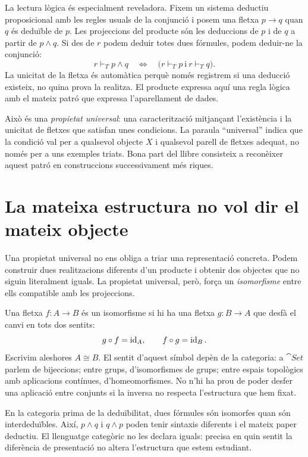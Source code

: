 La lectura lògica és especialment reveladora. Fixem un sistema deductiu
proposicional amb les regles usuals de la conjunció i posem una fletxa
$p\to q$ quan $q$ és deduïble de $p$. Les projeccions del producte són les
deduccions de $p$ i de $q$ a partir de $p\land q$. Si des de $r$ podem
deduir totes dues fórmules, podem deduir-ne la conjunció:
\[
  r\vdash_T p\land q
  \quad\Longleftrightarrow\quad
  \bigl(r\vdash_T p\ \text{i}\ r\vdash_T q\bigr).
\]
La unicitat de la fletxa és automàtica perquè només registrem si una
deducció existeix, no quina prova la realitza. El producte expressa aquí
una regla lògica amb el mateix patró que expressa l'aparellament de dades.

Això és una \emph{propietat universal}: una caracterització mitjançant
l'existència i la unicitat de fletxes que satisfan unes condicions.
La paraula \enquote{universal} indica que la condició val per a qualsevol objecte
$X$ i qualsevol parell de fletxes adequat, no només per a uns exemples
triats. Bona part del llibre consisteix a reconèixer aquest patró en
construccions successivament més riques.

\section{La mateixa estructura no vol dir el mateix objecte}

Una propietat universal no ens obliga a triar una representació concreta.
Podem construir dues realitzacions diferents d'un producte i obtenir dos
objectes que no siguin literalment iguals. La propietat universal, però,
força un \emph{isomorfisme} entre ells compatible amb les projeccions.

Una fletxa $f\colon A\to B$ és un isomorfisme si hi ha una fletxa
$g\colon B\to A$ que desfà el canvi en tots dos sentits:
\[
  g\circ f=\operatorname{id}_A,
  \qquad f\circ g=\operatorname{id}_B.
\]
Escrivim aleshores $A\cong B$. El sentit d'aquest símbol depèn de la
categoria: a $\cat{Set}$ parlem de bijeccions; entre grups, d'isomorfismes
de grups; entre espais topològics amb aplicacions contínues, d'homeomorfismes.
No n'hi ha prou de poder desfer una aplicació entre conjunts si la inversa
no respecta l'estructura que hem fixat.

En la categoria prima de la deduïbilitat, dues fórmules són isomorfes quan
són interdeduïbles. Així, $p\land q$ i $q\land p$ poden tenir sintaxis
diferents i el mateix paper deductiu. El llenguatge categòric no les
declara iguals: precisa en quin sentit la diferència de presentació no
altera l'estructura que estem estudiant.

